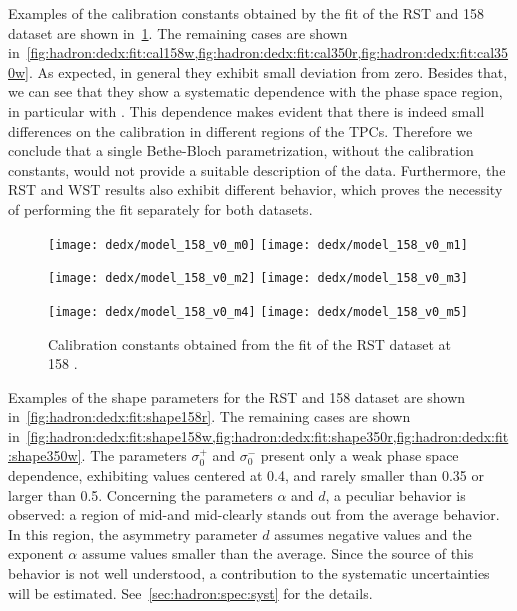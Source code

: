 Examples of the calibration constants obtained by the fit of the
RST and 158 \GeVc dataset are shown in~\cref{fig:hadron:dedx:fit:cal158r}.
The remaining cases are shown
in~\cref{fig:hadron:dedx:fit:cal158w,fig:hadron:dedx:fit:cal350r,fig:hadron:dedx:fit:cal350w}.
As expected, in general they exhibit small deviation
from zero. Besides that, we can see
that they show a systematic dependence with the phase space region,
in particular with \pT. This dependence makes evident that there is indeed
small differences on the \dedx calibration in different regions of the TPCs.
Therefore we conclude that a single Bethe-Bloch parametrization,
without the calibration constants, would not provide
a suitable description of the \dedx data. Furthermore,
the RST and WST results also exhibit different behavior,
which proves the necessity of performing the \dedx
fit separately for both datasets.

\begin{figure}[!ht]
  \centering
  \texttt{[image: dedx/model\_158\_v0\_m0]}
  \texttt{[image: dedx/model\_158\_v0\_m1]}

  \texttt{[image: dedx/model\_158\_v0\_m2]}
  \texttt{[image: dedx/model\_158\_v0\_m3]}

  \texttt{[image: dedx/model\_158\_v0\_m4]}
  \texttt{[image: dedx/model\_158\_v0\_m5]}
  \caption{Calibration constants obtained from the fit of the RST dataset at 158 \GeVc.}
  \label{fig:hadron:dedx:fit:cal158r}
\end{figure}


Examples of the shape parameters for the RST and 158 \GeVc dataset
are shown in~\cref{fig:hadron:dedx:fit:shape158r}. 
The remaining cases are shown
in~\cref{fig:hadron:dedx:fit:shape158w,fig:hadron:dedx:fit:shape350r,fig:hadron:dedx:fit:shape350w}. 
The parameters $\sigma_0^+$ and $\sigma_0^-$ present
only a weak phase space dependence, exhibiting values centered at
0.4, and rarely smaller than 0.35 or larger than 0.5.
Concerning the parameters $\alpha$ and $d$, a peculiar behavior
is observed: a region of mid-\pp and mid-\pT clearly
stands out from the average behavior. In this region, the asymmetry
parameter $d$ assumes negative values and the exponent $\alpha$ 
assume values smaller than the average.
Since the source of this behavior is not well understood,
a contribution to the systematic uncertainties will be estimated.
See~\cref{sec:hadron:spec:syst} for the details.

